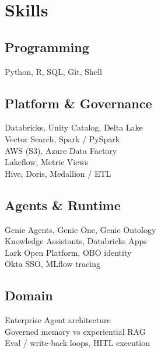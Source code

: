 \documentclass[letterpaper]{deedy-resume}
\begin{document}
\begin{minipage}[t]{0.33\textwidth} %


\section{Skills}
\vspace{1mm}

\subsection{Programming}
Python, R, SQL, Git, Shell

\sectionspace %

\subsection{Platform \& Governance}
Databricks, Unity Catalog, Delta Lake \\
Vector Search, Spark / PySpark \\
AWS (S3), Azure Data Factory \\
Lakeflow, Metric Views \\
Hive, Doris, Medallion / ETL

\sectionspace %

\subsection{Agents \& Runtime}
Genie Agents, Genie One, Genie Ontology \\
Knowledge Assistants, Databricks Apps \\
Lark Open Platform, OBO identity \\
Okta SSO, MLflow tracing

\sectionspace %

\subsection{Domain}
Enterprise Agent architecture \\
Governed memory vs experiential RAG \\
Eval / write-back loops, HITL execution 

\sectionspace %


\end{minipage}
\end{document}
